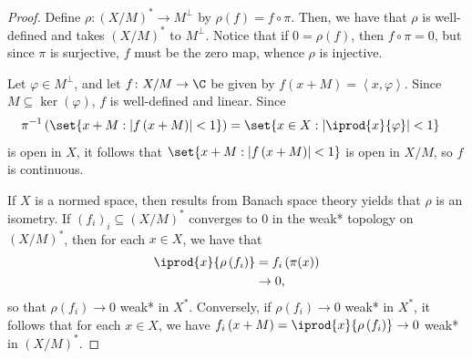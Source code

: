 \documentclass[10pt]{mypackage}
\begin{document}
\begin{proof}
  Define $\rho\colon \left( X/M \right)^{\ast}\rightarrow M^{\perp}$ by $\rho(f) = f\circ \pi$. Then, we have that $\rho$ is well-defined and takes $\left( X/M \right)^{\ast}$ to $M^{\perp}$. Notice that if $0 = \rho(f)$, then $f\circ \pi = 0$, but since $\pi$ is surjective, $f$ must be the zero map, whence $\rho$ is injective.

  Let $\varphi\in M^{\perp}$, and let $f\colon X/M\rightarrow \C$ be given by $f\left(x+M\right) = \left\langle x,\varphi \right\rangle$. Since $M\subseteq \ker\left( \varphi \right)$, $f$ is well-defined and linear. Since 
  \begin{align*}
    \pi^{-1}\left( \set{x + M : \left\vert f\left( x+M \right) \right\vert < 1} \right) &= \set{x\in X : \left\vert \iprod{x}{\varphi} \right\vert < 1}
  \end{align*}
  is open in $X$, it follows that $\set{x + M : \left\vert f\left( x+M \right) \right\vert < 1}$ is open in $X/M$, so $f$ is continuous.

  If $X$ is a normed space, then results from Banach space theory yields that $\rho$ is an isometry. If $\left( f_i \right)_{i}\subseteq \left( X/M \right)^{\ast}$ converges to $0$ in the weak* topology on $\left( X/M \right)^{\ast}$, then for each $x\in X$, we have that
  \begin{align*}
    \iprod{x}{\rho\left( f_i \right)} &= f_i\left( \pi(x) \right)\\
                                      &\rightarrow 0,
  \end{align*}
  so that $\rho\left( f_i \right)\rightarrow 0$ weak* in $X^{\ast}$. Conversely, if $\rho\left( f_i \right)\rightarrow 0$ weak* in $X^{\ast}$, it follows that for each $x\in X$, we have $f_i\left( x+M \right) = \iprod{x}{\rho\left( f_i \right)}\rightarrow 0$ weak* in $\left( X/M \right)^{\ast}$.
\end{proof}
\end{document}
